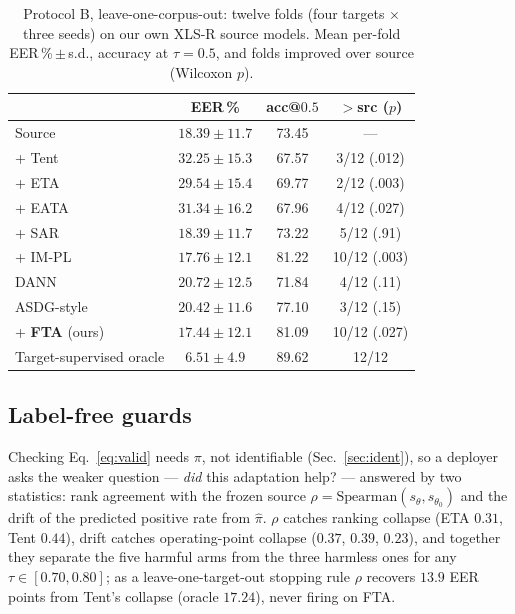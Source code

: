 \documentclass[10pt,letterpaper]{article}
\begin{document}
\begin{table}[t]
\centering
\caption{Protocol B, leave-one-corpus-out: twelve folds (four targets $\times$
three seeds) on our own XLS-R source models. Mean per-fold EER\,\%\,$\pm$\,s.d.,
accuracy at $\tau{=}0.5$, and folds improved over source (Wilcoxon $p$).}
\label{tab:protob}
\small
\setlength{\tabcolsep}{3.5pt}
\begin{tabular}{@{}lccc@{}}
\toprule
& EER\,\% & acc@$0.5$ & $>$src ($p$) \\
\midrule
Source & $18.39\pm11.7$ & 73.45 & --- \\
\;+ Tent~\cite{tent} & $32.25\pm15.3$ & 67.57 & 3/12 (.012) \\
\;+ ETA~\cite{eata} & $29.54\pm15.4$ & 69.77 & 2/12 (.003) \\
\;+ EATA~\cite{eata} & $31.34\pm16.2$ & 67.96 & 4/12 (.027) \\
\;+ SAR~\cite{sar} & $18.39\pm11.7$ & 73.22 & 5/12 (.91) \\
\;+ IM-PL~\cite{shot} & $17.76\pm12.1$ & 81.22 & 10/12 (.003) \\
DANN~\cite{dann} & $20.72\pm12.5$ & 71.84 & 4/12 (.11) \\
ASDG-style~\cite{asdg} & $20.42\pm11.6$ & 77.10 & 3/12 (.15) \\
\rowcolor{green!12}\;+ \textbf{FTA} (ours) & $\mathbf{17.44}\pm12.1$ & 81.09 & 10/12 (.027) \\
\midrule
Target-supervised oracle & $6.51\pm4.9$ & 89.62 & 12/12 \\
\bottomrule
\end{tabular}
\end{table}

\subsection{Label-free guards}
\label{sec:guards}
Checking Eq.~\eqref{eq:valid} needs $\pi$, not identifiable
(Sec.~\ref{sec:ident}), so a deployer asks the weaker question --- \emph{did}
this adaptation help? --- answered by two statistics: rank agreement with the
frozen source $\rho=\mathrm{Spearman}(s_\theta,s_{\theta_0})$ and the drift of the
predicted positive rate from $\hat\pi$. $\rho$ catches ranking collapse (ETA
$0.31$, Tent $0.44$), drift catches operating-point collapse ($0.37$, $0.39$,
$0.23$), and together they separate the five harmful arms from the three harmless
ones for any $\tau\in[0.70,0.80]$; as a leave-one-target-out stopping rule $\rho$
recovers $13.9$ EER points from Tent's collapse (oracle $17.24$), never firing on
FTA.
\end{document}
